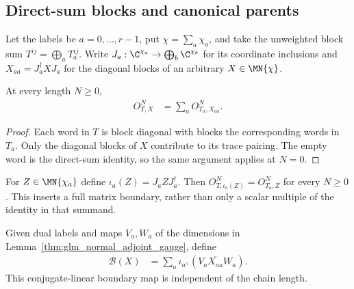 \subsection{Direct-sum blocks and canonical parents}

Let the labels be $a=0,\ldots,r-1$, put $\chi=\sum_a\chi_a$, and take
the unweighted block sum $T^{ij}=\bigoplus_aT_a^{ij}$.
Write $J_a:\C^{\chi_a}\to\bigoplus_b\C^{\chi_b}$ for its coordinate
inclusions and $X_{aa}=J_a^\dagger XJ_a$ for the diagonal blocks of an
arbitrary $X\in\MN{\chi}$.

\begin{lemma}
    \label{thm:glm_adjoint_block_diagonal}
    \leanok
    At every length $N\geq0$,
    \begin{align}
        O^N_{T,X} & =\sum_aO^N_{T_a,X_{aa}}.
        \label{eq:glm_adjoint_block_diagonal}
    \end{align}
\end{lemma}
\begin{proof}\leanok
    Each word in $T$ is block diagonal with blocks the corresponding
    words in $T_a$. Only the diagonal blocks of $X$ contribute to its
    trace pairing. The empty word is the direct-sum identity, so the
    same argument applies at $N=0$.
\end{proof}

\begin{definition}
    \label{def:glm_adjoint_block_inclusion}
    \leanok
    For $Z\in\MN{\chi_a}$ define $\iota_a(Z)=J_aZJ_a^\dagger$.
    Then $O^N_{T,\iota_a(Z)}=O^N_{T_a,Z}$ for every $N\geq0$.
    This inserts a full matrix boundary, rather than only a scalar
    multiple of the identity in that summand.
\end{definition}

\begin{definition}
    \label{def:glm_block_adjoint_transport}
    \leanok
    Given dual labels and maps $V_a,W_a$ of the dimensions in
    Lemma~\ref{thm:glm_normal_adjoint_gauge}, define
    \begin{align}
        \mathcal B(X)
         & =\sum_a\iota_{a^\vee}
        \!\left(V_a\overline{X_{aa}}W_a\right).
        \label{eq:glm_block_adjoint_transport}
    \end{align}
    This conjugate-linear boundary map is independent of the chain length.
\end{definition}

